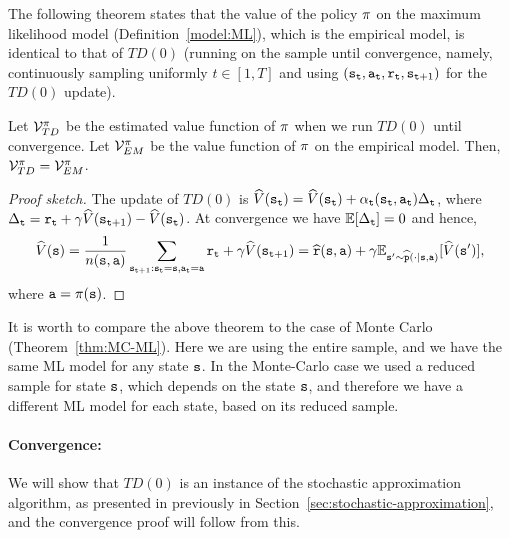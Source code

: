 The following theorem states that the value of the policy $\pi$ on the maximum likelihood model (Definition~\ref{model:ML}), which is the
empirical model, is identical to that of $TD(0)$ (running on the
sample until convergence, namely, continuously sampling uniformly
$t\in[1,T]$ and using $({\tt s}_{\tt t},
{\tt a}_{\tt t},{\tt r}_{\tt t},{\tt s}_{{\tt t}+1})$ for the $TD(0)$
update).

\begin{theorem}
Let $\mathcal{V}^\pi_{TD}$ be the estimated value function of
$\pi$ when we run $TD(0)$ until convergence. Let
$\mathcal{V}^\pi_{EM}$ be the value function of $\pi$ on the
empirical model. Then, $\mathcal{V}^\pi_{TD}=\mathcal{V}^\pi_{EM}$.
\end{theorem}


\begin{proof}[Proof sketch]
The update of $TD(0)$ is
$\widehat{V}({\tt s}_{\tt t})=\widehat{V}({\tt s}_{\tt t})+\alpha_{\tt t}({\tt s}_{\tt t},{\tt a}_{\tt t})\Delta_{\tt t}$,
where $\Delta_{\tt t}={\tt r}_{\tt t}+\gamma
\widehat{V}({\tt s}_{{\tt t}+1})-\widehat{V}({\tt s}_{\tt t})$. At
convergence we have $\mathbb{E}[\Delta_{\tt t}]=0$ and hence,
\[
\widehat{V}({\tt s})=\frac{1}{n({\tt s},{\tt a})}\sum_{{\tt s}_{{\tt t}+1}:{\tt s}_{\tt t}={\tt s},{\tt a}_{\tt t}={\tt a}}
{\tt r}_{\tt t}+\gamma
\widehat{V}({\tt s}_{{\tt t}+1})=\widehat{{\tt r}}({\tt s},{\tt a})+\gamma
\mathbb{E}_{{\tt s}'\sim
\widehat{{\tt p}}(\cdot|{\tt s},{\tt a})}[\widehat{V}({\tt s}')],
\]
where ${\tt a}=\pi({\tt s})$.
\end{proof}

It is worth to compare the above theorem to the case of Monte Carlo
(Theorem~\ref{thm:MC-ML}). Here we are using the entire sample, and
we have the same ML model for any state ${\tt s}$. In the Monte-Carlo
case we used a reduced sample for state ${\tt s}$, which depends on the state ${\tt s}$,
and therefore we have a different ML model for each state, based on its reduced sample.

\paragraph{Convergence:} 
We will show that $TD(0)$ is an
instance of the stochastic approximation algorithm, as presented in
previously in Section~\ref{sec:stochastic-approximation}, and the
convergence proof will follow from this.


